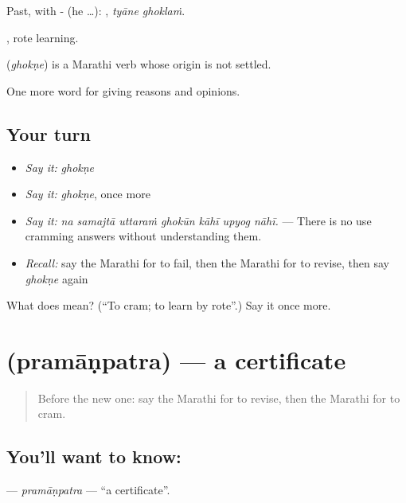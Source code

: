 Past, with - (he …):  , \emph{tyāne ghoklaṁ}.

, rote learning.

\begin{cousinweb}
\textbf{} (\emph{ghokṇe}) is a Marathi verb whose origin is not settled.
\end{cousinweb}

\begin{grammarlens}[title={What you've built}]
One more word for giving reasons and opinions.
\end{grammarlens}

\subsection*{Your turn}
\begin{itemize}
\raggedright
  \item \emph{Say it:} \emph{ghokṇe}
  \item \emph{Say it:} \emph{ghokṇe}, once more
  \item \emph{Say it:} \emph{na samajtā uttaraṁ ghokūn kāhī upyog nāhī.} — There is no use cramming answers without understanding them.
  \item \emph{Recall:} say the Marathi for to fail, then the Marathi for to revise, then say \emph{ghokṇe} again
\end{itemize}

\begin{tcolorbox}[breakable,colback=teal!4,colframe=teal!35!black,title={Before you move on}]
What does  mean? (\textquotedblleft{}To cram; to learn by rote\textquotedblright{}.) Say it once more.
\end{tcolorbox}
\section[\texorpdfstring{\mr{प्रमाणपत्र} (pramāṇpatra)}{प्रमाणपत्र (pramāṇpatra)}]{ (pramāṇpatra) — a certificate}

\label{lesson:MR-C371-pramanpatra}



\begin{quote}
Before the new one: say the Marathi for to revise, then the Marathi for to cram.
\end{quote}

\subsection*{You'll want to know: }
\textbf{} — \emph{pramāṇpatra} — \textquotedblleft{}a certificate\textquotedblright{}.

